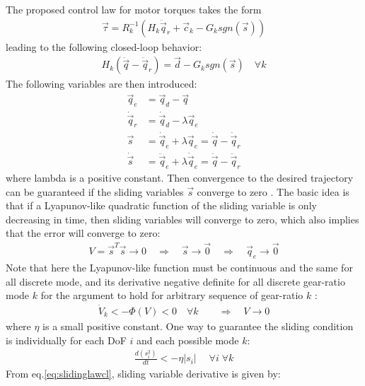 The proposed control law for motor torques takes the form
%
\begin{align}
\vec{\tau} = R_k^{-1} \left( H_k \ddot{\vec{q}}_r + \vec{c}_k - G_k sgn( \vec{s} ) \right) 
\label{eq:slidinglaw}
\end{align}
%
leading to the following closed-loop behavior:
%
\begin{align}
H_k ( \ddot{\vec{q}} - \ddot{\vec{q}}_r ) = \vec{d} - G_k sgn( \vec{s} ) \quad \forall k
\label{eq:slidinglawcl}
\end{align}
%
The following variables are then introduced:
\begin{align}
\vec{q}_e       &= \vec{q}_d       - \vec{q} \\
\dot{\vec{q}}_r &= \dot{\vec{q}}_d - \lambda  \vec{q}_e \\
\vec{s}         &= \dot{\vec{q}}_e + \lambda  \vec{q}_e  = \dot{\vec{q}} - \dot{\vec{q}}_r \\
\dot{\vec{s}}   &= \ddot{\vec{q}}_e + \lambda  \dot{\vec{q}}_e  = \ddot{\vec{q}} - \ddot{\vec{q}}_r
\end{align}
%
where lambda is a positive constant. Then convergence to the desired trajectory can be guaranteed if the sliding variables $\vec{s}$ converge to zero \cite{slotine_applied_1991}. The basic idea is that if a Lyapunov-like quadratic function of the sliding variable is only decreasing in time, then sliding variables will converge to zero, which also implies that the error will converge to zero:
%
\begin{align}
V = \vec{s}^T \vec{s} \rightarrow 0 \quad\Rightarrow\quad  \vec{s} \rightarrow \vec{0} \quad\Rightarrow\quad \vec{q}_e \rightarrow \vec{0}
\end{align}
%
Note that here the Lyapunov-like function must be continuous and the same for all discrete mode, and its derivative negative definite for all discrete gear-ratio mode $k$ for the argument to hold for arbitrary sequence of gear-ratio $k$ \cite{liberzon_switching_2003}:
%
\begin{align}
\dot{V}_k < -\Phi( V ) < 0 \quad \forall k \quad \quad\Rightarrow\quad V \rightarrow 0
\end{align}
%
where $\eta$ is a small positive constant. One way to guarantee the sliding condition is individually for each DoF $i$ and each possible mode $k$:
%
\begin{align}
\frac{d( s_i^2 )}{dt} < -\eta |s_i| \; \quad \forall i \; \forall k
\label{eq:slidingcondition}
\end{align}
%
From eq.\eqref{eq:slidinglawcl}, sliding variable derivative is given by:
